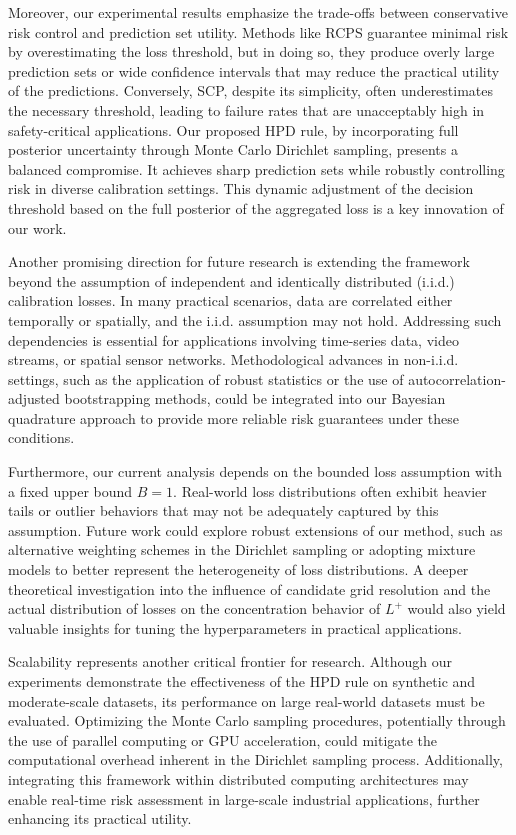 \documentclass{article} %
\begin{document}
Moreover, our experimental results emphasize the trade-offs between conservative risk control and prediction set utility. Methods like RCPS guarantee minimal risk by overestimating the loss threshold, but in doing so, they produce overly large prediction sets or wide confidence intervals that may reduce the practical utility of the predictions. Conversely, SCP, despite its simplicity, often underestimates the necessary threshold, leading to failure rates that are unacceptably high in safety-critical applications. Our proposed HPD rule, by incorporating full posterior uncertainty through Monte Carlo Dirichlet sampling, presents a balanced compromise. It achieves sharp prediction sets while robustly controlling risk in diverse calibration settings. This dynamic adjustment of the decision threshold based on the full posterior of the aggregated loss is a key innovation of our work.

Another promising direction for future research is extending the framework beyond the assumption of independent and identically distributed (i.i.d.) calibration losses. In many practical scenarios, data are correlated either temporally or spatially, and the i.i.d. assumption may not hold. Addressing such dependencies is essential for applications involving time-series data, video streams, or spatial sensor networks. Methodological advances in non-i.i.d. settings, such as the application of robust statistics or the use of autocorrelation-adjusted bootstrapping methods, could be integrated into our Bayesian quadrature approach to provide more reliable risk guarantees under these conditions.

Furthermore, our current analysis depends on the bounded loss assumption with a fixed upper bound \(B=1\). Real-world loss distributions often exhibit heavier tails or outlier behaviors that may not be adequately captured by this assumption. Future work could explore robust extensions of our method, such as alternative weighting schemes in the Dirichlet sampling or adopting mixture models to better represent the heterogeneity of loss distributions. A deeper theoretical investigation into the influence of candidate grid resolution and the actual distribution of losses on the concentration behavior of \(L^+\) would also yield valuable insights for tuning the hyperparameters in practical applications.

Scalability represents another critical frontier for research. Although our experiments demonstrate the effectiveness of the HPD rule on synthetic and moderate-scale datasets, its performance on large real-world datasets must be evaluated. Optimizing the Monte Carlo sampling procedures, potentially through the use of parallel computing or GPU acceleration, could mitigate the computational overhead inherent in the Dirichlet sampling process. Additionally, integrating this framework within distributed computing architectures may enable real-time risk assessment in large-scale industrial applications, further enhancing its practical utility.
\end{document}
